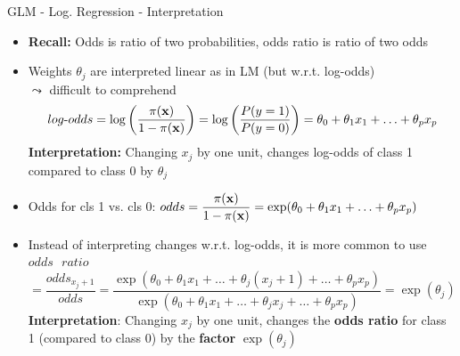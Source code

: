 \documentclass[10pt,compress,t,notes=noshow, xcolor=table]{beamer}
\begin{document}
\begin{frame}[c]{GLM - Log. Regression - Interpretation}

    \begin{itemize}
        \item \textbf{Recall:} Odds is ratio of two probabilities, odds ratio is ratio of two odds 
        \item Weights $\theta_j$ are interpreted linear as in LM (but w.r.t. log-odds) \\
        $\leadsto$ difficult to comprehend
        $$log\text{-}odds = \log \left(\frac{\pi(\mathbf{x})}{1 - \pi(\mathbf{x})}\right) = \log \left(\frac{P(y=1)}{P(y=0)}\right) = \theta_0 + \theta_1 x_1 + \ldots + \theta_p x_p  $$
        \textbf{Interpretation:} Changing $x_j$ by one unit, changes log-odds of class 1 compared to class 0 by $\theta_j$%
        \pause
        \item Odds for cls 1 vs. cls 0: %
        $odds = \displaystyle\frac{\pi(\mathbf{x})}{1 - \pi(\mathbf{x})}= \exp(\theta_0 + \theta_1 x_1 + \ldots + \theta_p x_p)$
        \item Instead of interpreting changes w.r.t. log-odds, it is more common to use $odds\text{ }ratio$ 
        $$ = \frac{odds_{x_j+1}}{odds} = \frac{\exp(\theta_0 + \theta_1 x_1 + \ldots + \theta_j (x_j+1) + \ldots + \theta_p x_p)}{\exp(\theta_0 + \theta_1 x_1 + \ldots + \theta_j x_j + \ldots + \theta_p x_p)} = \exp{(\theta_j)} $$
        \textbf{Interpretation}: Changing $x_j$ by one unit, changes the \textbf{odds ratio} for class 1 (compared to class 0) by the \textbf{factor} $\exp(\theta_j)$
    \end{itemize}	

\end{frame}
\end{document}
